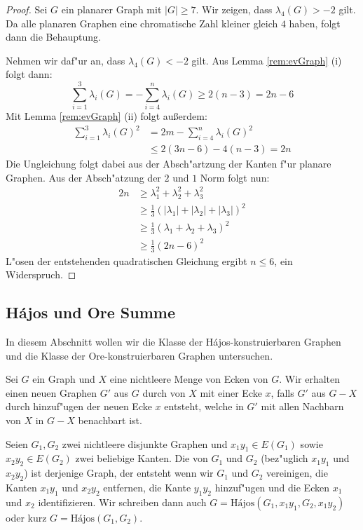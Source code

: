 \begin{proof}
  Sei $G$ ein planarer Graph mit $|G| \geq 7$.
  Wir zeigen, dass $\lambda_4(G) > -2$ gilt. Da alle planaren Graphen eine chromatische Zahl kleiner gleich $4$ haben, folgt dann die Behauptung.

  Nehmen wir daf"ur an, dass $\lambda_{4}(G) < -2$ gilt.
  Aus Lemma \ref{rem:evGraph} (i) folgt dann:
  \begin{equation*}
    \sum\limits_{i=1}^3 \lambda_{i}(G) = -\sum\limits_{i=4}^{n}\lambda_{i}(G) \geq 2 (n-3) = 2n-6
  \end{equation*}
  Mit Lemma \ref{rem:evGraph} (ii) folgt au{\ss}erdem:
  \begin{align*}
    \sum\limits_{i=1}^3 \lambda_{i}(G)^{2} &= 2m -\sum\limits_{i=4}^{n}\lambda_{i}(G)^{2} \\
    &\leq 2(3n-6) -4(n-3) = 2n
  \end{align*}
  Die Ungleichung folgt dabei aus der Absch"artzung der Kanten f"ur planare Graphen. Aus der Absch"atzung der $2$ und $1$ Norm folgt nun:
  \begin{align*}
    2n &\geq \lambda_{1}^{2} +\lambda_{2}^{2} +\lambda_{3}^{2}  \\ &\geq \frac{1}{3} (|\lambda_{1}| + |\lambda_2| + |\lambda_3|)^{2} \\
    &\geq \frac{1}{3}(\lambda_{1}+ \lambda_2 + \lambda_3)^{2}\\ &\geq \frac{1}{3}(2n-6)^{2}
  \end{align*}
  L"osen der entstehenden quadratischen Gleichung ergibt $n\leq 6$, ein Widerspruch.
\end{proof} 
\subsection{H\'ajos und Ore Summe}
In diesem Abschnitt wollen wir die Klasse der H\'ajos-konstruierbaren Graphen und die Klasse der Ore-konstruierbaren Graphen untersuchen. 

Sei $G$ ein Graph und $X$ eine nichtleere Menge von Ecken von $G$. Wir erhalten einen neuen Graphen $G'$ aus $G$ durch   von $X$ mit einer Ecke $x$, falls $G'$ aus $G-X$ durch hinzuf"ugen der neuen Ecke $x$ entsteht, welche in $G'$ mit allen Nachbarn von $X$ in $G-X$ benachbart ist. 

Seien $G_1, G_2$ zwei nichtleere disjunkte Graphen und $x_1y_1\in E(G_1)$ sowie $x_2y_2 \in E(G_2)$ zwei beliebige Kanten. Die  \cite{Hajos61} von $G_1$ und $G_2$ (bez"uglich $x_1y_1$ und $x_2y_2$) ist derjenige Graph, der entsteht wenn wir $G_1$ und $G_2$ vereinigen, die Kanten $x_1y_1$ und $x_2y_2$ entfernen, die Kante $y_1y_2$ hinzuf"ugen und  die Ecken $x_1$ und $x_2$ identifizieren. Wir schreiben dann auch $G= \text{H\'ajos}(G_1,x_1y_1,G_2,x_1y_2)$ oder
kurz $G= \text{H\'ajos}(G_1,G_2)$.

